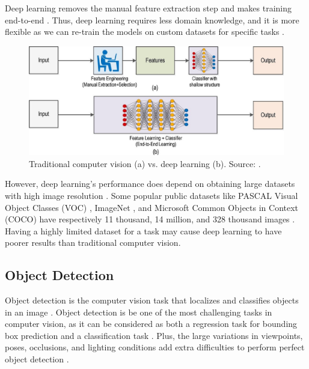 \documentclass[a4paper, 11pt, oneside]{article}
\begin{document}
Deep learning removes the manual feature extraction step and makes training end-to-end \cite{elgendy2020deep, o2019deep}.
Thus, deep learning requires less domain knowledge, and it is more flexible as we can re-train the models on custom
datasets for specific tasks \cite{o2019deep}.

\begin{figure}[ht]
  \begin{center}
    \includegraphics[width=.7\textwidth]{deep_learning_vs_traditional_computer_vision.png}
  \end{center}
  \caption{Traditional computer vision (a) vs. deep learning (b). Source: \cite{o2019deep}.}
\end{figure}

However, deep learning's performance does depend on obtaining large datasets with high image resolution \cite{o2019deep}.
Some popular public datasets like PASCAL Visual Object Classes (VOC) \cite{everingham2010pascal}, ImageNet
\cite{russakovsky2015imagenet}, and Microsoft Common Objects in Context (COCO) \cite{lin2014microsoft}
have respectively 11 thousand, 14 million, and 328 thousand images \cite{liu2020deep}. Having a highly limited dataset
for a task may cause deep learning to have poorer results than traditional computer vision.

\subsection{Object Detection}

\label{sec:objectdetection}

Object detection is the computer vision task that localizes and classifies objects in an image
\cite{elgendy2020deep, zhao2019object, liu2020deep, geron2019hands}. Object detection is be one of the most
challenging tasks in computer vision, as it can be considered as both a regression task for bounding box prediction
and a classification task \cite{elgendy2020deep, geron2019hands, girshick2014rich}. Plus, the large variations in
viewpoints, poses, occlusions, and lighting conditions add extra difficulties to perform perfect object detection
\cite{zhao2019object, liu2020deep}.
\end{document}
